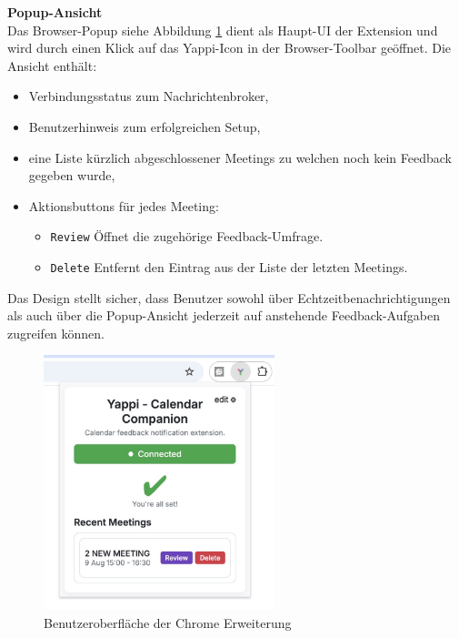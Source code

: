 \documentclass[12pt,a4paper]{report}
\begin{document}
        \textbf{Popup-Ansicht} \\
            Das Browser-Popup siehe Abbildung \ref{fig:yappi-extension-popup} dient als Haupt-UI der Extension und wird durch einen
            Klick auf das Yappi-Icon in der Browser-Toolbar geöffnet.
            Die Ansicht enthält:
            \begin{itemize}
                \item Verbindungsstatus zum Nachrichtenbroker,
                \item Benutzerhinweis zum erfolgreichen Setup,
                \item eine Liste kürzlich abgeschlossener Meetings zu welchen noch kein Feedback gegeben wurde,
                \item Aktionsbuttons für jedes Meeting:
                    \begin{itemize}
                        \item \texttt{Review} Öffnet die zugehörige Feedback-Umfrage.
                        \item \texttt{Delete} Entfernt den Eintrag aus der Liste der letzten Meetings.
                    \end{itemize}
            \end{itemize}
            Das Design stellt sicher, dass Benutzer sowohl über Echtzeitbenachrichtigungen als auch über die Popup-Ansicht
            jederzeit auf anstehende Feedback-Aufgaben zugreifen können.

            \begin{figure}[!htbp]
              \centering
              \includegraphics[width=0.60\textwidth]{../figures/yappi-chrome-extension/yappi-extension-popup.jpg}
              \caption{Benutzeroberfläche der Chrome Erweiterung}
              \label{fig:yappi-extension-popup}
            \end{figure}
\end{document}
